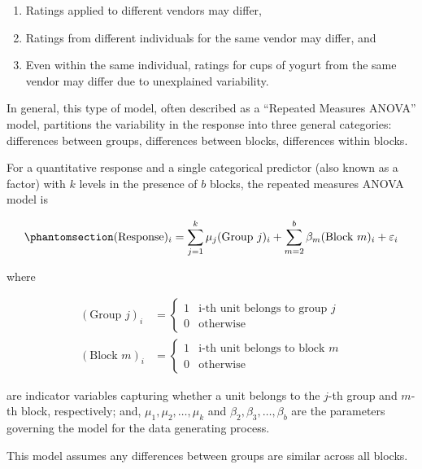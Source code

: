\documentclass[
  letterpaper,
  DIV=11,
  numbers=noendperiod]{scrreprt}
\providecommand{\tightlist}{%
  \setlength{\itemsep}{0pt}\setlength{\parskip}{0pt}}\usepackage{longtable,booktabs,array}
\theoremstyle{plain}
\theoremstyle{definition}
\theoremstyle{definition}
\theoremstyle{remark}
\begin{document}
\begin{enumerate}
\def\labelenumi{\arabic{enumi}.}
\tightlist
\item
  Ratings applied to different vendors may differ,
\item
  Ratings from different individuals for the same vendor may differ, and
\item
  Even within the same individual, ratings for cups of yogurt from the
  same vendor may differ due to unexplained variability.
\end{enumerate}

In general, this type of model, often described as a ``Repeated Measures
ANOVA'' model, partitions the variability in the response into three
general categories: differences between groups, differences between
blocks, differences within blocks.

\begin{tcolorbox}[enhanced jigsaw, breakable, titlerule=0mm, colframe=quarto-callout-important-color-frame, bottomtitle=1mm, opacityback=0, rightrule=.15mm, toptitle=1mm, arc=.35mm, bottomrule=.15mm, left=2mm, title=\textcolor{quarto-callout-important-color}{\faExclamation}\hspace{0.5em}{Repeated Measures ANOVA Model}, leftrule=.75mm, coltitle=black, toprule=.15mm, colbacktitle=quarto-callout-important-color!10!white, colback=white, opacitybacktitle=0.6]

For a quantitative response and a single categorical predictor (also
known as a factor) with \(k\) levels in the presence of \(b\) blocks,
the repeated measures ANOVA model is

\begin{equation}\phantomsection\label{eq-blocks}{(\text{Response})_i = \sum_{j = 1}^{k} \mu_j (\text{Group } j)_i + \sum_{m = 2}^{b} \beta_m (\text{Block } m)_i + \varepsilon_i}\end{equation}

where

\[
\begin{aligned}
  (\text{Group } j)_i 
    &= \begin{cases} 1 & \text{i-th unit belongs to group } j \\ 0 & \text{otherwise} \end{cases} \\
  (\text{Block } m)_i 
    &= \begin{cases} 1 & \text{i-th unit belongs to block } m \\ 0 & \text{otherwise} \end{cases}
\end{aligned}
\]

are indicator variables capturing whether a unit belongs to the \(j\)-th
group and \(m\)-th block, respectively; and,
\(\mu_1, \mu_2, \dotsc, \mu_k\) and
\(\beta_2, \beta_3, \dotsc, \beta_b\) are the parameters governing the
model for the data generating process.

This model assumes any differences between groups are similar across all
blocks.

\end{tcolorbox}
\end{document}
